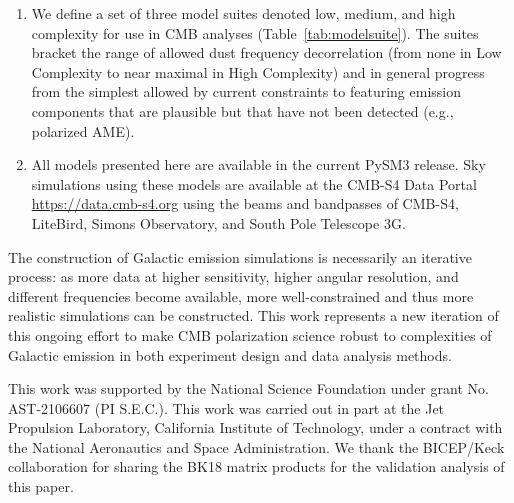 \documentclass[twocolumn]{aastex631}
\begin{document}
\begin{enumerate}
    \item We define a set of three model suites denoted low, medium, and high complexity for use in CMB analyses (Table~\ref{tab:modelsuite}). The suites bracket the range of allowed dust frequency decorrelation (from none in Low Complexity to near maximal in High Complexity) and in general progress from the simplest allowed by current constraints to featuring emission components that are plausible but that have not been detected (e.g., polarized AME). 
    \item All models presented here are available in the current PySM3 release. Sky simulations using these models are available at the CMB-S4 Data Portal \url{https://data.cmb-s4.org} using the beams and bandpasses of CMB-S4, LiteBird, Simons Observatory, and South Pole Telescope 3G.
\end{enumerate}

The construction of Galactic emission simulations is necessarily an iterative process: as more data at higher sensitivity, higher angular resolution, and different frequencies become available, more well-constrained and thus more realistic simulations can be constructed. This work represents a new iteration of this ongoing effort to make CMB polarization science robust to complexities of Galactic emission in both experiment design and data analysis methods. %

\begin{acknowledgments}

This work was supported by the National Science Foundation under grant No. AST-2106607 (PI S.E.C.). This work was carried out in part at the Jet Propulsion Laboratory, California Institute of Technology, under a contract with the National Aeronautics and Space Administration. We thank the BICEP/Keck collaboration for sharing the BK18 matrix products for the validation analysis of this paper. 

\end{acknowledgments}


\end{document}
